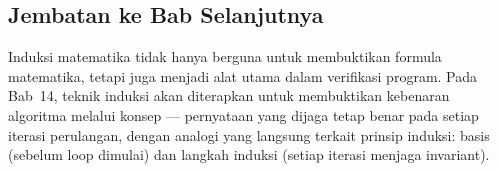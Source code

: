 \subsection{Jembatan ke Bab Selanjutnya}

Induksi matematika tidak hanya berguna untuk membuktikan formula matematika, tetapi juga menjadi alat utama dalam verifikasi program. Pada Bab~14, teknik induksi akan diterapkan untuk membuktikan kebenaran algoritma melalui konsep  --- pernyataan yang dijaga tetap benar pada setiap iterasi perulangan, dengan analogi yang langsung terkait prinsip induksi: basis (sebelum loop dimulai) dan langkah induksi (setiap iterasi menjaga invariant).
